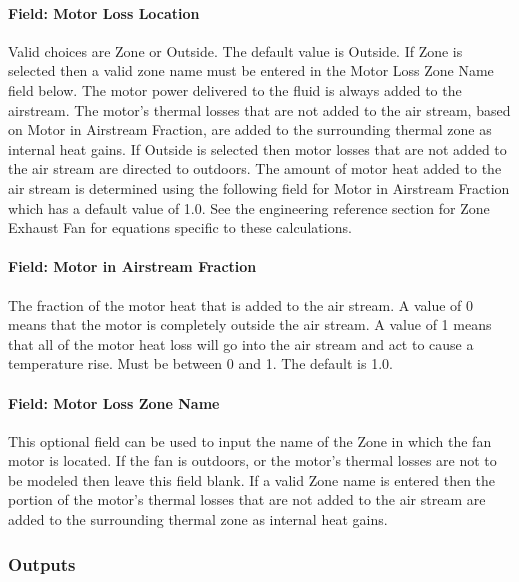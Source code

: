 \paragraph{Field: Motor Loss Location}\label{field-motor-loss-location}

Valid choices are Zone or Outside. The default value is Outside. If Zone is selected then a valid zone name must be entered in the Motor Loss Zone Name field below. The motor power delivered to the fluid is always added to the airstream. The motor's thermal losses that are not added to the air stream, based on Motor in Airstream Fraction, are added to the surrounding thermal zone as internal heat gains. If Outside is selected then motor losses that are not added to the air stream are directed to outdoors. The amount of motor heat added to the air stream is determined using the following field for Motor in Airstream Fraction which has a default value of 1.0. See the engineering reference section for Zone Exhaust Fan for equations specific to these calculations.

\paragraph{Field: Motor in Airstream Fraction}\label{field-motor-in-airstream-fraction-31}

The fraction of the motor heat that is added to the air stream. A value of 0 means that the motor is completely outside the air stream. A value of 1 means that all of the motor heat loss will go into the air stream and act to cause a temperature rise. Must be between 0 and 1. The default is 1.0.

\paragraph{Field: Motor Loss Zone Name}\label{field-loss-zone-name-fanzoneexhaustl}

This optional field can be used to input the name of the Zone in which the fan motor is located.  If the fan is outdoors, or the motor's thermal losses are not to be modeled then leave this field blank.  If a valid Zone name is entered then the portion of the motor's thermal losses that are not added to the air stream are added to the surrounding thermal zone as internal heat gains.


\subsubsection{Outputs}\label{outputs-3-007}

